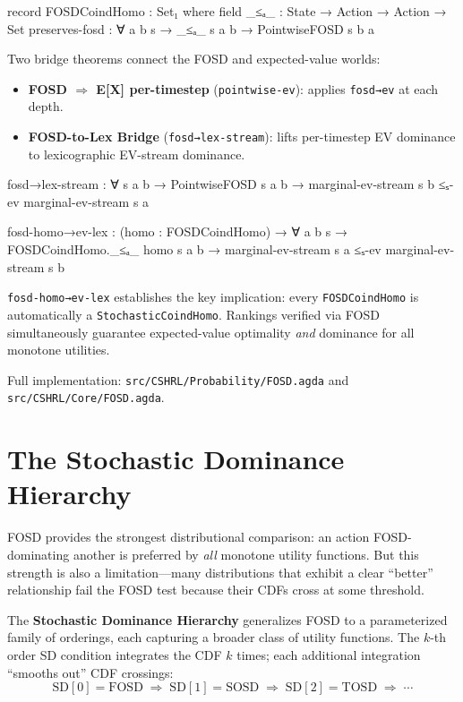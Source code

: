 \documentclass[9pt,a4paper]{article}
\newcommand{\fpath}[1]{\nolinkurl{#1}}
\theoremstyle{plain}
\theoremstyle{definition}
\theoremstyle{remark}
\begin{document}
\begin{spec}
  record FOSDCoindHomo : Set₁ where
    field
      _≤ₐ_ : State → Action → Action → Set
      preserves-fosd : ∀ a b s →
        _≤ₐ_ s a b → PointwiseFOSD s b a
\end{spec}

\noindent Two bridge theorems connect the FOSD and expected-value worlds:
\begin{itemize}
\item \textbf{FOSD $\Rightarrow$ E[X] per-timestep} (\texttt{pointwise-ev}): applies \texttt{fosd→ev} at each depth.
\item \textbf{FOSD-to-Lex Bridge} (\texttt{fosd→lex-stream}): lifts per-timestep EV dominance to lexicographic EV-stream dominance.
\end{itemize}

\begin{spec}
  fosd→lex-stream : ∀ s a b →
    PointwiseFOSD s a b →
    marginal-ev-stream s b ≤ₛ-ev marginal-ev-stream s a

  fosd-homo→ev-lex : (homo : FOSDCoindHomo) →
    ∀ a b s → FOSDCoindHomo._≤ₐ_ homo s a b →
      marginal-ev-stream s a ≤ₛ-ev marginal-ev-stream s b
\end{spec}

\noindent \texttt{fosd-homo→ev-lex} establishes the key implication: every \texttt{FOSDCoindHomo} is automatically a \texttt{StochasticCoindHomo}.  Rankings verified via FOSD simultaneously guarantee expected-value optimality \emph{and} dominance for all monotone utilities.

Full implementation: \fpath{src/CSHRL/Probability/FOSD.agda} and \fpath{src/CSHRL/Core/FOSD.agda}.

\section{The Stochastic Dominance Hierarchy}\label{sec:sd-hierarchy}

FOSD provides the strongest distributional comparison: an action FOSD-dominating another is preferred by \emph{all} monotone utility functions.  But this strength is also a limitation---many distributions that exhibit a clear ``better'' relationship fail the FOSD test because their CDFs cross at some threshold.

The \textbf{Stochastic Dominance Hierarchy} generalizes FOSD to a parameterized family of orderings, each capturing a broader class of utility functions.  The $k$-th order SD condition integrates the CDF $k$ times; each additional integration ``smooths out'' CDF crossings:
\[
\text{SD}[0] = \text{FOSD} \;\Rightarrow\; \text{SD}[1] = \text{SOSD} \;\Rightarrow\; \text{SD}[2] = \text{TOSD} \;\Rightarrow\; \cdots
\]
\end{document}
